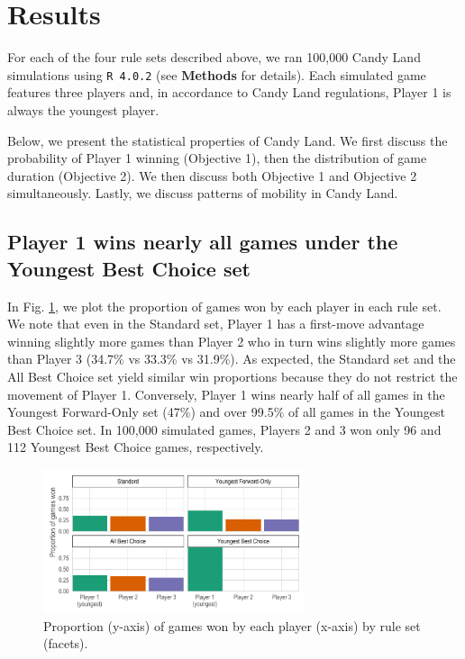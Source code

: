 \documentclass[letterpaper,9pt,twocolumn,twoside,]{pinp}
\begin{document}
\hypertarget{results}{%
\section{Results}\label{results}}

For each of the four rule sets described above, we ran 100,000 Candy
Land simulations using \texttt{R\ 4.0.2} (see \textbf{Methods} for
details). Each simulated game features three players and, in accordance
to Candy Land regulations, Player 1 is always the youngest player.

Below, we present the statistical properties of Candy Land. We first
discuss the probability of Player 1 winning (Objective 1), then the
distribution of game duration (Objective 2). We then discuss both
Objective 1 and Objective 2 simultaneously. Lastly, we discuss patterns
of mobility in Candy Land.

\hypertarget{player-1-wins-nearly-all-games-under-the-youngest-best-choice-set}{%
\subsection{Player 1 wins nearly all games under the Youngest Best
Choice
set}\label{player-1-wins-nearly-all-games-under-the-youngest-best-choice-set}}

In Fig. \ref{fig:p_win_props}, we plot the proportion of games won by
each player in each rule set. We note that even in the Standard set,
Player 1 has a first-move advantage winning slightly more games than
Player 2 who in turn wins slightly more games than Player 3 (34.7\% vs
33.3\% vs 31.9\%). As expected, the Standard set and the All Best Choice
set yield similar win proportions because they do not restrict the
movement of Player 1. Conversely, Player 1 wins nearly half of all games
in the Youngest Forward-Only set (47\%) and over 99.5\% of all games in
the Youngest Best Choice set. In 100,000 simulated games, Players 2 and
3 won only 96 and 112 Youngest Best Choice games, respectively.

\begin{figure}
  \begin{center}
    \includegraphics[width=3in]{./../../plots/p_win_props.pdf}
    \caption{Proportion (y-axis) of games won by each player (x-axis) by rule set (facets).}
    \label{fig:p_win_props}
  \end{center}
\end{figure}
\end{document}
